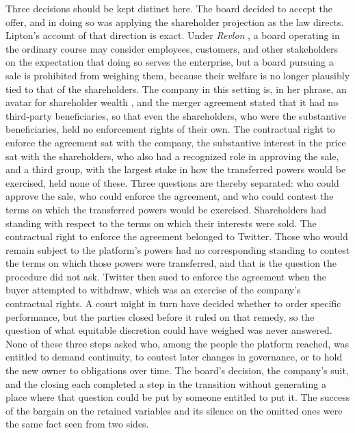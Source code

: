 \documentclass[11pt]{article}
\theoremstyle{definition}
\begin{document}
Three decisions should be kept distinct here. The board decided to accept the offer, and in doing so was applying the shareholder projection as the law directs. Lipton's account of that direction is exact. Under \emph{Revlon} \cite[182]{revlon1986}, a board operating in the ordinary course may consider employees, customers, and other stakeholders on the expectation that doing so serves the enterprise, but a board pursuing a sale is prohibited from weighing them, because their welfare is no longer plausibly tied to that of the shareholders. The company in this setting is, in her phrase, an avatar for shareholder wealth \cite[393]{lipton2024}, and the merger agreement stated that it had no third-party beneficiaries, so that even the shareholders, who were the substantive beneficiaries, held no enforcement rights of their own. The contractual right to enforce the agreement sat with the company, the substantive interest in the price sat with the shareholders, who also had a recognized role in approving the sale, and a third group, with the largest stake in how the transferred powers would be exercised, held none of these. Three questions are thereby separated: who could approve the sale, who could enforce the agreement, and who could contest the terms on which the transferred powers would be exercised. Shareholders had standing with respect to the terms on which their interests were sold. The contractual right to enforce the agreement belonged to Twitter. Those who would remain subject to the platform's powers had no corresponding standing to contest the terms on which those powers were transferred, and that is the question the procedure did not ask. Twitter then sued to enforce the agreement when the buyer attempted to withdraw, which was an exercise of the company's contractual rights. A court might in turn have decided whether to order specific performance, but the parties closed before it ruled on that remedy, so the question of what equitable discretion could have weighed was never answered. None of these three steps asked who, among the people the platform reached, was entitled to demand continuity, to contest later changes in governance, or to hold the new owner to obligations over time. The board's decision, the company's suit, and the closing each completed a step in the transition without generating a place where that question could be put by someone entitled to put it. The success of the bargain on the retained variables and its silence on the omitted ones were the same fact seen from two sides.
\end{document}

